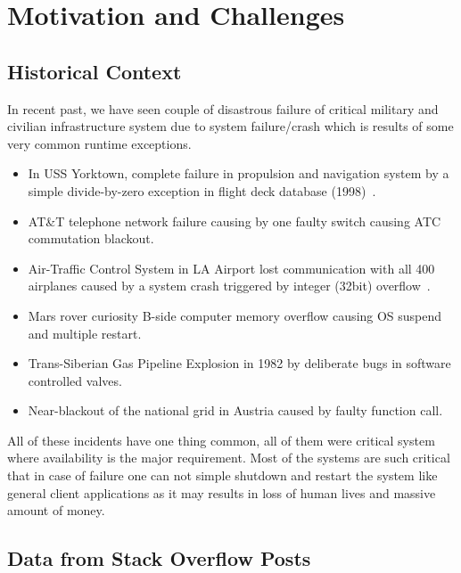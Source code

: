 
\chapter{Motivation and Challenges}
\label{chapter:motivation}


\section{Historical Context}
\label{section:historicalContext}

In recent past, we have seen couple of disastrous failure of critical military
and civilian infrastructure system due to system failure/crash which is results
of some very common runtime exceptions.

\begin{itemize}
  
  \item In USS Yorktown, complete failure in propulsion and navigation system by
  a simple divide-by-zero exception in flight deck database (1998)~\cite{Ship}.
  
  \item AT\&T telephone network failure causing by one faulty switch causing ATC
  commutation blackout.
  
  \item Air-Traffic Control System in LA Airport lost communication with all 400
  airplanes caused by a system crash triggered by integer (32bit)
  overflow~\cite{LAATC}.
  
  \item Mars rover curiosity B-side computer memory overflow causing OS suspend
  and multiple restart.
  
  \item Trans-Siberian Gas Pipeline Explosion in 1982 by deliberate bugs in
  software controlled valves.
  
  \item Near-blackout of the national grid in Austria caused by faulty function
  call.
  
\end{itemize}

All of these incidents have one thing common, all of them were critical system
where availability is the major requirement. Most of the systems are such
critical that in case of failure one can not simple shutdown and restart the
system like general client applications as it may results in loss of human lives
and massive amount of money.

\section{Data from Stack Overflow Posts}
\label{section:stackoverflow}

